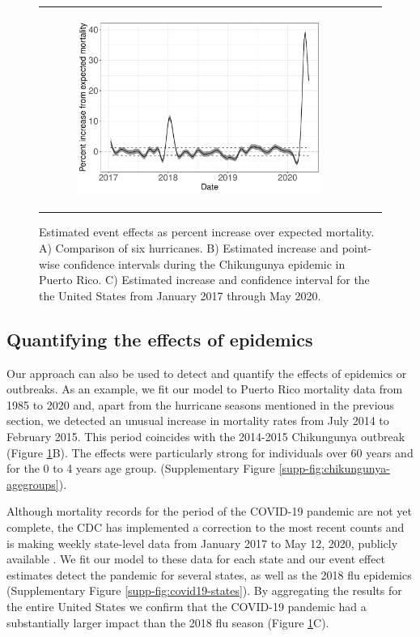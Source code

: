 \documentclass[11pt]{article}
\begin{document}
\begin{figure}[ht]
\begin{tabular}{lll}
\begin{subfigure}[t]{0.30\linewidth}
		\includegraphics[width=1\linewidth]{figs/figure-1c.pdf}
	\end{subfigure}\\
    \end{tabular}
    \caption{Estimated event effects as percent increase over expected mortality. A) Comparison of six hurricanes. B) Estimated increase and point-wise confidence intervals  during the Chikungunya epidemic in Puerto Rico. C) Estimated increase and confidence interval for the the United States from January 2017 through May 2020.}
    \label{fig:fhat-estimates}
\end{figure}

\subsection{Quantifying the effects of epidemics}
\label{subsec:epidemics}
Our approach can also be used to detect and quantify the effects of epidemics or outbreaks. As an example, we fit our model to Puerto Rico mortality data from 1985 to 2020 and, apart from the hurricane seasons mentioned in the previous section, we detected an unusual increase in mortality rates from July 2014 to February 2015. This period coincides with the 2014-2015 Chikungunya outbreak \cite{sharp2016surveillance, hsu2019risk}  (Figure \ref{fig:fhat-estimates}B). The effects were particularly strong for individuals over 60 years and for the 0 to 4 years age group. (Supplementary Figure \ref{supp-fig:chikungunya-agegroups}).


Although mortality records for the period of the COVID-19 pandemic are not yet complete, the CDC has implemented a correction to the most recent counts and is making weekly state-level data from January 2017 to May 12, 2020, publicly available \cite{cdc2020covid19}. We fit our model to these data for each state and our event effect estimates detect the pandemic for several states, as well as the 2018 flu epidemics (Supplementary Figure \ref{supp-fig:covid19-states}). By aggregating the results for the entire United States we confirm that the COVID-19 pandemic had a substantially larger impact than the 2018 flu season
(Figure \ref{fig:fhat-estimates}C).
 
\end{document}
